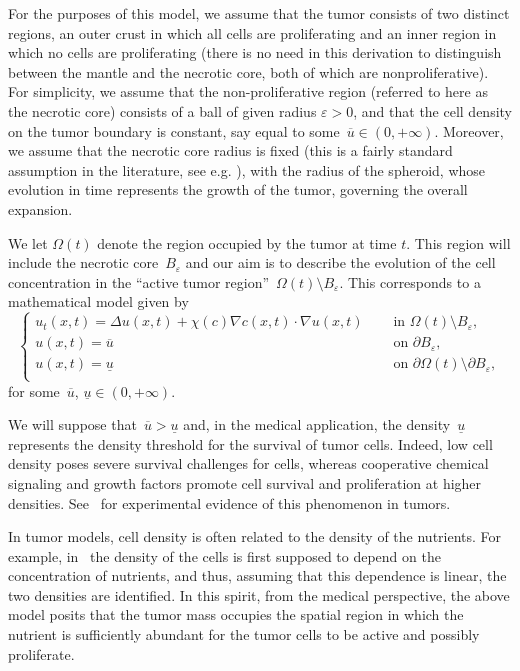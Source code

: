 \documentclass[12pt,a4paper,intlimits,sumlimits]{amsart}
\theoremstyle{definition}
\theoremstyle{plain}
\numberwithin{equation}{section}
\begin{document}
For the purposes of this model,  we assume that the tumor consists of two distinct regions, an outer crust in which all cells are proliferating and an inner region in which no cells are proliferating (there is no
need in this derivation to distinguish between the mantle and the necrotic core,
both of which are nonproliferative).  For simplicity, we assume that the non-proliferative region (referred to here as the necrotic core) consists
of a ball of given radius $\varepsilon>0$,
and that the cell density on the tumor boundary is constant,
say equal to some~$\overline{u}\in(0,+\infty)$.
Moreover, we assume that the necrotic core radius is fixed (this is a fairly standard assumption in the literature, see e.g. \cite{LU2023}), with the radius of the spheroid, whose evolution in time represents the growth of the tumor, governing the overall expansion.
 
We let $\Omega(t)$ denote the region occupied by the tumor at time $t$.
This region will include the necrotic core~$B_\varepsilon$
and our aim is to describe the evolution of the cell concentration
in the ``active tumor region''~$\Omega(t)\setminus B_\varepsilon$.
This corresponds to a mathematical model given by
\begin{equation}\label{maingen1}
\begin{cases}
u_t (x,t)= \Delta u(x, t) +\chi(c) \nabla c(x, t)\cdot\nabla u(x, t) &\quad\mbox{ in } \Omega(t)\setminus B_\varepsilon,\\
u(x, t)=\overline{u} &\quad\mbox{ on } \partial B_\varepsilon,\\
u(x, t)=\underline{u} &\quad\mbox{ on } \partial\Omega(t)\setminus\partial B_\varepsilon,\\
\end{cases}
\end{equation} for some~$\overline{u}$, $\underline{u} \in(0,+\infty)$.

We will suppose that~$\overline{u}>\underline{u}$ and, in the medical application,
the density~$\underline{u}$ represents the density threshold
for the survival of tumor cells.
Indeed, low cell density poses severe survival challenges for cells, whereas cooperative chemical signaling and growth factors promote cell survival and proliferation at higher densities. See~\cite{qwjudfbn23o4t52022, MR4648489, COOPETU25} for experimental evidence of this phenomenon in tumors.

In tumor models, cell density is often related to the density of the nutrients.
For example, in~\cite{MR2237681}
the density of the cells  is first supposed to depend on the concentration of nutrients, and thus, assuming that this dependence is linear, the two densities are identified. In this spirit, from the medical perspective, the above model posits that the tumor mass occupies the spatial region
in which the nutrient is sufficiently abundant for the tumor cells to be active and possibly proliferate.
\end{document}

